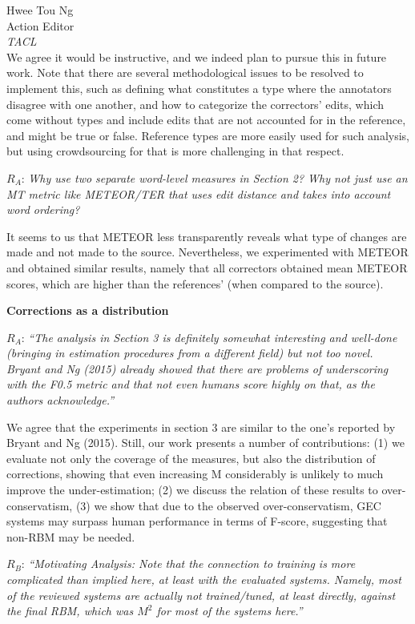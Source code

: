 \documentclass[11pt,letterpaper]{letter}
\begin{document}
\begin{letter}{%
Hwee Tou Ng\\
Action Editor\\
{\em TACL}\\
}
We agree it would be instructive, and we indeed plan to pursue this in future work. Note that there are several methodological issues to be resolved to implement this, such as defining what constitutes a type where the annotators disagree with one another, and how to categorize the correctors' edits, which come without types and {\color{red} include edits that are not accounted for in the reference, and might be true or false. Reference types are more easily used for such analysis, but using crowdsourcing for that is more challenging in that respect.}
	
$R_A$: \emph{Why use two separate word-level measures in Section 2? Why not just use
	an MT metric like METEOR/TER that uses edit distance and takes into account
	word ordering?}

It seems to us that METEOR less transparently reveals what type of changes are made and not made to the source. Nevertheless, we experimented with METEOR and obtained similar results, namely that all correctors obtained mean METEOR scores, which are higher than the references' (when compared to the source).

{\bf Corrections as a distribution}

$R_A$: \emph{``The analysis in Section 3 is definitely somewhat interesting and
	well-done (bringing in estimation procedures from a different field) but not
	too novel. Bryant and Ng (2015) already showed that there are problems of
	underscoring with the F0.5 metric and that not even humans score highly on
	that, as the authors acknowledge.''
	}
	
We agree that the experiments in section 3 are similar to the one's reported by Bryant and Ng (2015). Still, our work presents a number of contributions: (1) we evaluate not only the coverage of the measures, but also the distribution of corrections, showing that even increasing M considerably is unlikely to much improve the under-estimation; (2) we discuss the relation of these results to over-conservatism, (3) we show that due to the observed over-conservatism, GEC systems may surpass human performance in terms of F-score, suggesting that non-RBM may be needed.

$R_B$: \emph{``Motivating Analysis: Note that the connection to training is more
	complicated than implied here, at least with the evaluated systems. Namely,
	most of the reviewed systems are actually not trained/tuned, at least
	directly, against the final RBM, which was $M^2$ for most of the systems here.''
	}
	

\end{letter}
\end{document}
